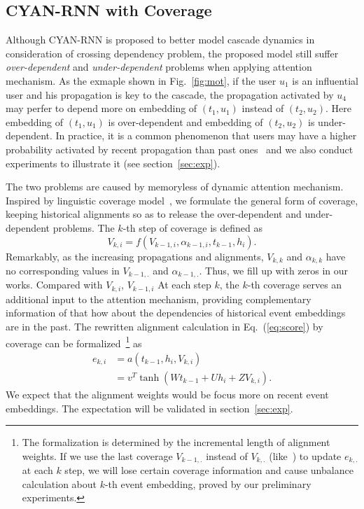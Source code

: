 \subsection{CYAN-RNN with Coverage}
\label{sec:coverage}

Although CYAN-RNN is proposed to better model cascade dynamics in consideration
of crossing dependency problem, the proposed model still suffer
\emph{over-dependent} and \emph{under-dependent} problems when applying
attention mechanism.
As the exmaple shown in Fig.~\ref{fig:mot}, if the user $u_1$ is an influential
user and his propagation is key to the cascade, the propagation activated by
$u_4$ may perfer to depend more on embedding of $(t_1, u_1)$ instead of $(t_2, u_2)$.
Here embedding of $(t_1, u_1)$ is over-dependent and embedding of $(t_2, u_2)$
is under-dependent. In practice, it is a common phenomenon that users may have a
higher probability activated by recent propagation than past ones~\cite{} and we
also conduct experiments to illustrate it (see section~\ref{sec:exp}).

The two problems are caused by memoryless of dynamic attention mechanism.
Inspired by linguistic coverage model~\cite{tu2016modeling}, we formulate the
general form of coverage, keeping historical alignments so
as to release the over-dependent and under-dependent problems. The $k$-th step
of coverage is defined as
\begin{equation}
\label{eq:cov}
V_{k,i}=f\left(V_{k-1, i}, \alpha_{k-1,i}, t_{k-1}, h_i\right).
\end{equation}
Remarkably, as the increasing propagations and alignments, $V_{k,k}$ and
$\alpha_{k,k}$ have no corresponding values in $V_{k-1,.}$ and
$\alpha_{k-1,.}$. Thus, we fill up with zeros in our works. 
Compared with $V_{k,i}$, $V_{k-1,i}$ 
At each step $k$, the $k$-th coverage serves an additional input to the
attention mechanism, providing complementary information of that how about the
dependencies of historical event embeddings are in the past. The rewritten
alignment calculation in Eq.~(\ref{eq:score}) by coverage can be
formalized~\footnote{The formalization is determined by the incremental length
of alignment weights. If we use the last coverage $V_{k-1,.}$ instead of
$V_{k,.}$ (like~\cite{tu2016modeling}) to update $e_{k,.}$ at each $k$
step, we will lose certain coverage information and cause unbalance
calculation about $k$-th event embedding, proved by our preliminary experiments.} as
\begin{equation}
\label{eq:att_cov}
\begin{aligned}
e_{k,i} &= a(t_{k-1}, h_i, V_{k,i}) \\
& = v^T\tanh(W t_{k-1}+U h_i+Z V_{k,i}).
\end{aligned}
\end{equation}
We expect that the alignment weights would be focus more on recent event
embeddings. The expectation will be validated in section~\ref{sec:exp}.   


